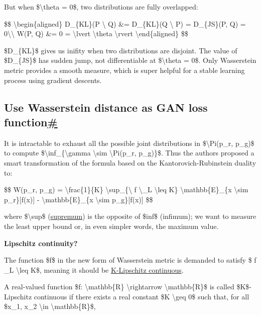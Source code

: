 But when \$\textbackslash theta = 0\$, two distributions are fully overlapped:

\$\$ \textbackslash begin\{aligned\} D\_\{KL\}(P \textbackslash\textbar{} Q) \&= D\_\{KL\}(Q \textbackslash\textbar{} P) = D\_\{JS\}(P, Q) = 0\textbackslash\textbackslash{} W(P, Q) \&= 0 = \textbackslash lvert \textbackslash theta \textbackslash rvert \textbackslash end\{aligned\} \$\$

\$D\_\{KL\}\$ gives us inifity when two distributions are disjoint. The value of \$D\_\{JS\}\$ has sudden jump, not differentiable at \$\textbackslash theta = 0\$. Only Wasserstein metric provides a smooth measure, which is super helpful for a stable learning process using gradient descents.

\subsection{\texorpdfstring{Use Wasserstein distance as GAN loss function\hyperref[use-wasserstein-distance-as-gan-loss-function]{\#}}{Use Wasserstein distance as GAN loss function\#}}\label{use-wasserstein-distance-as-gan-loss-function}

It is intractable to exhaust all the possible joint distributions in \$\textbackslash Pi(p\_r, p\_g)\$ to compute \$\textbackslash inf\_\{\textbackslash gamma \textbackslash sim \textbackslash Pi(p\_r, p\_g)\}\$. Thus the authors proposed a smart transformation of the formula based on the Kantorovich-Rubinstein duality to:

\$\$ W(p\_r, p\_g) = \textbackslash frac\{1\}\{K\} \textbackslash sup\_\{\textbackslash\textbar{} f \textbackslash\textbar\_L \textbackslash leq K\} \textbackslash mathbb\{E\}\_\{x \textbackslash sim p\_r\}{[}f(x){]} - \textbackslash mathbb\{E\}\_\{x \textbackslash sim p\_g\}{[}f(x){]} \$\$

where \$\textbackslash sup\$ (\href{https://en.wikipedia.org/wiki/Infimum_and_supremum}{supremum}) is the opposite of \$inf\$ (infimum); we want to measure the least upper bound or, in even simpler words, the maximum value.

\textbf{Lipschitz continuity?}

The function \$f\$ in the new form of Wasserstein metric is demanded to satisfy \$\textbar{} f \textbar\_L \textbackslash leq K\$, meaning it should be \href{https://en.wikipedia.org/wiki/Lipschitz_continuity}{K-Lipschitz continuous}.

A real-valued function \$f: \textbackslash mathbb\{R\} \textbackslash rightarrow \textbackslash mathbb\{R\}\$ is called \$K\$-Lipschitz continuous if there exists a real constant \$K \textbackslash geq 0\$ such that, for all \$x\_1, x\_2 \textbackslash in \textbackslash mathbb\{R\}\$,


